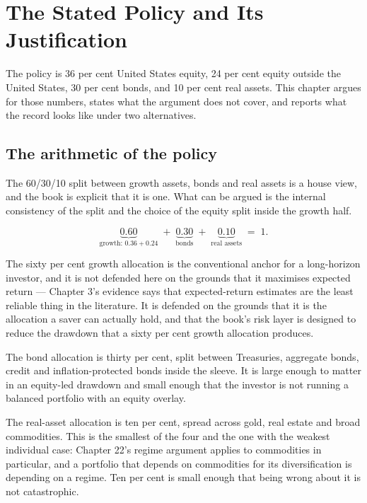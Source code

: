
\chapter{The Stated Policy and Its Justification}
\label{ch:policy}

The policy is 36 per cent United States equity, 24 per cent equity outside
the United States, 30 per cent bonds, and 10 per cent real assets. This
chapter argues for those numbers, states what the argument does not cover,
and reports what the record looks like under two alternatives.

\section{The arithmetic of the policy}

The 60/30/10 split between growth assets, bonds and real assets is a
house view, and the book is explicit that it is one. What can be argued
is the internal consistency of the split and the choice of the equity
split inside the growth half.

\begin{equation}
\underbrace{0.60}_{\text{growth: } 0.36 + 0.24}
\;+\;
\underbrace{0.30}_{\text{bonds}}
\;+\;
\underbrace{0.10}_{\text{real assets}}
\;=\; 1.
\end{equation}

The sixty per cent growth allocation is the conventional anchor for a
long-horizon investor, and it is not defended here on the grounds that it
maximises expected return --- Chapter 3's evidence says that
expected-return estimates are the least reliable thing in the literature.
It is defended on the grounds that it is the allocation a saver can
actually hold, and that the book's risk layer is designed to reduce the
drawdown that a sixty per cent growth allocation produces.

The bond allocation is thirty per cent, split between Treasuries, aggregate
bonds, credit and inflation-protected bonds inside the sleeve. It is
large enough to matter in an equity-led drawdown and small enough that the
investor is not running a balanced portfolio with an equity overlay.

The real-asset allocation is ten per cent, spread across gold, real
estate and broad commodities. This is the smallest of the four and the
one with the weakest individual case: Chapter 22's regime argument
applies to commodities in particular, and a portfolio that depends on
commodities for its diversification is depending on a regime. Ten per cent
is small enough that being wrong about it is not catastrophic.

